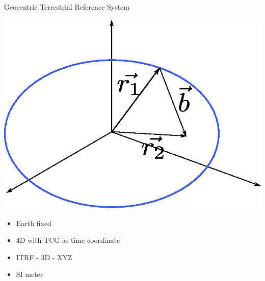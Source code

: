 \documentclass[14pt,table,t, c]{beamer}
\begin{document}
\begin{frame}{Geocentric Terrestrial Reference System}
\begin{minipage}[t][][c]{0.48\linewidth}
	\includegraphics[width=\linewidth]{figure/trs}
\end{minipage}
\begin{minipage}[t][][c]{0.5\linewidth}
\begin{itemize}
\item Earth fixed
\item 4D with TCG as time coordinate 
\item ITRF - 3D - XYZ 
\item SI meter
\end{itemize}
\end{minipage}
\end{frame}
\end{document}
